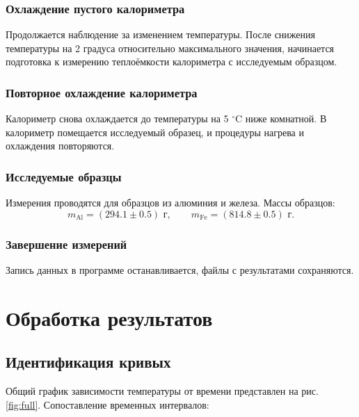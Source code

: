 \documentclass[a4paper,12pt]{article}
\begin{document}
\subsubsection{Охлаждение пустого калориметра}
Продолжается наблюдение за изменением температуры. После снижения температуры на 2 градуса относительно максимального значения, начинается подготовка к измерению теплоёмкости калориметра с исследуемым образцом.

\subsubsection{Повторное охлаждение калориметра}
Калориметр снова охлаждается до температуры на 5 $^\circ$C ниже комнатной. В калориметр помещается исследуемый образец, и процедуры нагрева и охлаждения повторяются.

\subsubsection{Исследуемые образцы}
Измерения проводятся для образцов из алюминия и железа. Массы образцов:
\begin{equation}
    m_{\text{Al}} = (294.1 \pm 0.5) \text{ г}, \qquad m_{\text{Fe}} = (814.8 \pm 0.5) \text{ г}.
\end{equation}

\subsubsection{Завершение измерений}
Запись данных в программе останавливается, файлы с результатами сохраняются.

\section{Обработка результатов}

\subsection{Идентификация кривых}
Общий график зависимости температуры от времени представлен на рис. \ref{fig:full}. Сопоставление временных интервалов:
\end{document}
